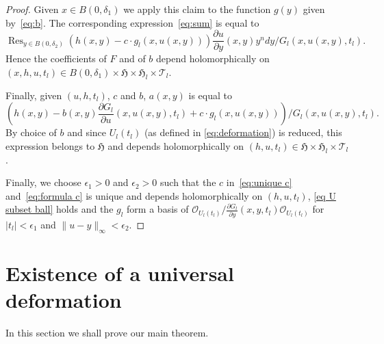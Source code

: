 \documentclass[11pt,twoside]{amsart}
\theoremstyle{plain}
\newcommand{\Tm}{\mathcal{T}}
\newcommand{\Sh}[1]{\mathcal{#1}} %
\DeclareMathOperator*{\Res}{Res}
\begin{document}
\begin{proof}
Given $x\in B(0,\delta_1)$ we apply this claim to the function $g(y)$ given by~\eqref{eq:b}. The corresponding expression~\eqref{eq:sum} is equal to
$$\Res_{y\in B(0,\delta_2)}\left(h(x,y)-c\cdot g_l(x,u(x,y))\right)\frac{\partial u}{\partial y}(x,y)y^ndy\big/G_l(x,u(x,y),t_l).$$
Hence the coefficients of $F$ and of $b$ depend holomorphically on $(x,h,u,t_l)\in B(0,\delta_1)\times\mathfrak{H}\times\mathfrak{H}_l\times\Tm_l$.

Finally, given $(u,h,t_l)$,  $c$ and $b$, $a(x,y)$ is equal to
$$\left(h(x,y)-b(x,y)\frac{\partial G_l}{\partial u}(x,u(x,y),t_l)+c\cdot g_l(x,u(x,y))\right)\big/G_l(x,u(x,y),t_l).$$
By choice of $b$ and since $U_l(t_l)$ (as defined in \eqref{eq:deformation}) is reduced, this expression belongs to $\mathfrak{H}$ and depends holomorphically on $(h,u,t_l)\in\mathfrak {H}\times\mathfrak{H}_l\times\Tm_l$.

Finally, we choose $\epsilon_1>0$ and $\epsilon_2>0$ such that the $c$ in~\eqref{eq:unique c} and~\eqref{eq:formula c} is unique and depends holomorphically on $(h,u,t_l)$, \eqref{eq U subset ball} holds and the $g_l$ form a basis of $\Sh{O}_{U_l(t_l)}\big/\frac{\partial G_l}{\partial y}(x,y,t_l)\Sh{O}_{U_l(t_l)}$ for $|t_l|<\epsilon_1$ and $\|u-y\|_\infty<\epsilon_2$.
\end{proof}
\section {Existence of a universal deformation}\label{sec:existence}
In this section we shall prove our main theorem.
\end{document}
